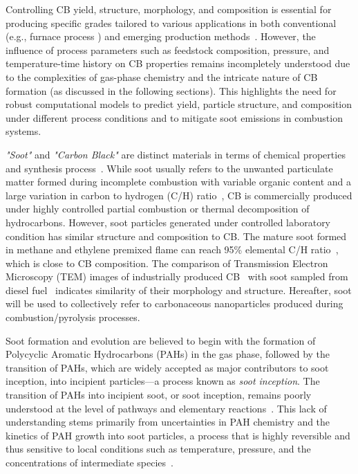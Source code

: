 Controlling CB yield, structure, morphology, and composition is essential for producing specific grades tailored to various applications in both conventional (e.g., furnace process \citep{dames2023plasma}) and emerging production methods~\citep{li2017experimental, fulcheri2023energy, patlolla2023review}. However, the influence of process parameters such as feedstock composition, pressure, and temperature-time history on CB properties remains incompletely understood due to the complexities of gas-phase chemistry and the intricate nature of CB formation (as discussed in the following sections). This highlights the need for robust computational models to predict yield, particle structure, and composition under different process conditions and to mitigate soot emissions in combustion systems.

\textit{"Soot"} and \textit{"Carbon Black"} are distinct materials in terms of chemical properties and synthesis process~\cite{watson2001carbon}. While soot usually refers to the unwanted particulate matter formed during incomplete combustion with variable organic content and a large variation in carbon to hydrogen (C/H) ratio~\citep{watson2001carbon}, CB is commercially produced under highly controlled partial combustion or thermal decomposition of hydrocarbons. However, soot particles generated under controlled laboratory condition has similar structure and composition to CB. The mature soot formed in methane and ethylene premixed flame can reach 95\% elemental C/H ratio~\cite{russo2015dehydrogenation}, which is close to CB composition. The comparison of Transmission Electron Microscopy (TEM) images of industrially produced CB~\citep{singh2018nanostructure} with soot sampled from diesel fuel~\citep{vander2007hrtem, lapuerta2017morphological} indicates similarity of their morphology and structure. Hereafter, soot will be used to collectively refer to carbonaceous nanoparticles produced during combustion/pyrolysis processes.

Soot formation and evolution are believed to begin with the formation of Polycyclic Aromatic Hydrocarbons (PAHs) in the gas phase, followed by the transition of PAHs, which are widely accepted as major contributors to soot inception, into incipient particles—a process known as \textit{soot inception}.
The transition of PAHs into incipient soot, or soot inception, remains poorly understood at the level of pathways and elementary reactions~\citep{Wang2011}. This lack of understanding stems primarily from uncertainties in PAH chemistry and the kinetics of PAH growth into soot particles, a process that is highly reversible and thus sensitive to local conditions such as temperature, pressure, and the concentrations of intermediate species~\citep{Wang2011}.

